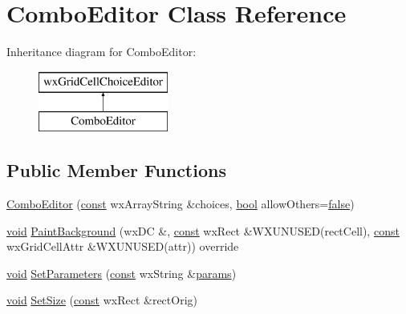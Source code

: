 \hypertarget{class_combo_editor}{}\section{Combo\+Editor Class Reference}
\label{class_combo_editor}
Inheritance diagram for Combo\+Editor\+:\begin{figure}[H]
\begin{center}
\leavevmode
\includegraphics[height=2.000000cm]{class_combo_editor}
\end{center}
\end{figure}
\subsection*{Public Member Functions}
\begin{DoxyCompactItemize}
\item 
\hyperlink{class_combo_editor_a2a083ec683bae3b6fb1c95a4451b84ee}{Combo\+Editor} (\hyperlink{getopt1_8c_a2c212835823e3c54a8ab6d95c652660e}{const} wx\+Array\+String \&choices, \hyperlink{mac_2config_2i386_2lib-src_2libsoxr_2soxr-config_8h_abb452686968e48b67397da5f97445f5b}{bool} allow\+Others=\hyperlink{mac_2config_2i386_2lib-src_2libsoxr_2soxr-config_8h_a65e9886d74aaee76545e83dd09011727}{false})
\item 
\hyperlink{sound_8c_ae35f5844602719cf66324f4de2a658b3}{void} \hyperlink{class_combo_editor_a176dc1b768350cc32566f961b09bc4a8}{Paint\+Background} (wx\+DC \&, \hyperlink{getopt1_8c_a2c212835823e3c54a8ab6d95c652660e}{const} wx\+Rect \&W\+X\+U\+N\+U\+S\+ED(rect\+Cell), \hyperlink{getopt1_8c_a2c212835823e3c54a8ab6d95c652660e}{const} wx\+Grid\+Cell\+Attr \&W\+X\+U\+N\+U\+S\+ED(attr)) override
\item 
\hyperlink{sound_8c_ae35f5844602719cf66324f4de2a658b3}{void} \hyperlink{class_combo_editor_a31efb07e9b052be9494837e003ce837a}{Set\+Parameters} (\hyperlink{getopt1_8c_a2c212835823e3c54a8ab6d95c652660e}{const} wx\+String \&\hyperlink{_reverb_8cpp_aacc5617877d2aa4d17c729c1c8ba4eec}{params})
\item 
\hyperlink{sound_8c_ae35f5844602719cf66324f4de2a658b3}{void} \hyperlink{class_combo_editor_a77604e2460170c91044a7cc9e5be1599}{Set\+Size} (\hyperlink{getopt1_8c_a2c212835823e3c54a8ab6d95c652660e}{const} wx\+Rect \&rect\+Orig)
\end{DoxyCompactItemize}


